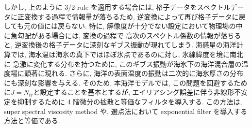 しかし, 上のように 3/2-rule を適用する場合には, 格子データをスペクトルデータに正変換する過程で情報量が落ちるため, 
逆変換によって再び格子データに戻しても元の値には戻らない. 
特に, 解像度が十分でない設定において物理場の中に急勾配がある場合には, 変換の過程で
高次のスペクトル係数の情報が落ちると, 逆変換後の格子データに深刻なギブス振動が現れてしまう. 
海惑星の海洋計算では, 海水温は海氷の真下ではほぼ氷点であるのに対し, 氷線緯度を境に南北に
急激に変化する分布を持つために, このギブス振動が海氷下の海洋混合層の温度場に顕著に現れる.
さらに, 海洋の表面温度の振動は二次的に海氷厚さの分布にも深刻な影響を与える.
そのため, 本海洋モデルでは, この問題を回避するために$J=N_{tr}$と設定することを基本とするが,  
エイリアシング誤差に伴う非線形不安定を抑制するために 4 階微分の拡散と等価なフィルタを導入する. 
この方法は, super spectral viscosity method や, 選点法において exponential filter
を導入する方法と等価である.

